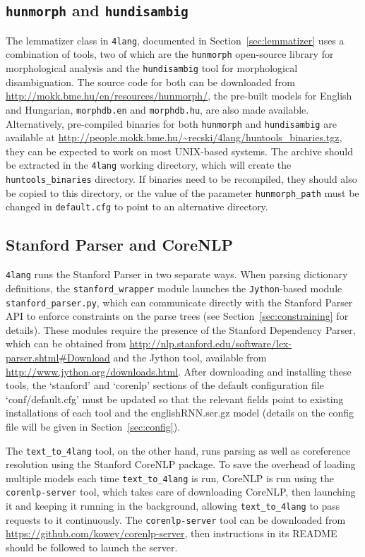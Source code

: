 \documentclass{article}
\newcommand{\tfl}{\texttt{text\_to\_4lang}\xspace}
\newcommand{\fl}{\texttt{4lang}\xspace}
\begin{document}
\subsection{\texttt{hunmorph} and \texttt{hundisambig}}
The lemmatizer class in \fl, documented in Section~\ref{sec:lemmatizer} uses a
combination of tools, two of which are the \texttt{hunmorph} open-source library
for morphological analysis and the \texttt{hundisambig} tool for morphological
disambiguation. The source code for both can be downloaded from
\url{http://mokk.bme.hu/en/resources/hunmorph/}, the pre-built models for
English and Hungarian, \texttt{morphdb.en} and \texttt{morphdb.hu}, are also
made available. Alternatively, pre-compiled binaries for both \texttt{hunmorph}
and \texttt{hundisambig} are available at
\url{http://people.mokk.bme.hu/~recski/4lang/huntools_binaries.tgz}, they can
be expected to work on most UNIX-based systems. The archive should be extracted
in the \fl working directory, which will create the \texttt{huntools\_binaries}
directory. If binaries need to be recompiled, they should also be copied to
this directory, or the value of the parameter \texttt{hunmorph\_path} must be
changed in \texttt{default.cfg} to point to an alternative directory.

\subsection{Stanford Parser and CoreNLP}
\fl runs the Stanford Parser in two separate ways. When parsing dictionary
definitions, the \texttt{stanford\_wrapper} module launches the
\texttt{Jython}-based module \texttt{stanford\_parser.py}, which can
communicate directly with the Stanford Parser API to enforce constraints on the
parse trees (see Section~\ref{sec:constraining} for details). These modules
require the presence of the
Stanford Dependency Parser, which can be obtained from
\url{http://nlp.stanford.edu/software/lex-parser.shtml#Download}
and the Jython tool,
available from \url{http://www.jython.org/downloads.html}.
After downloading and installing these tools, the
`stanford' and `corenlp' sections of the default configuration file
`conf/default.cfg' must be updated so that the relevant fields point to 
existing installations of each tool and the englishRNN.ser.gz model
(details on the config file will be given in Section~\ref{sec:config}).

The \tfl tool, on the other hand, runs parsing as well as coreference
resolution using the Stanford CoreNLP package. To save the overhead of loading
multiple models each time \tfl is run, CoreNLP is run using the
\texttt{corenlp-server} tool, which takes care of downloading CoreNLP, then
launching it and keeping it running in the background, allowing \tfl to pass
requests to it continuously. The \texttt{corenlp-server} tool can be downloaded
from \url{https://github.com/kowey/corenlp-server}, then instructions in its
README should be followed to launch the server.
\end{document}
